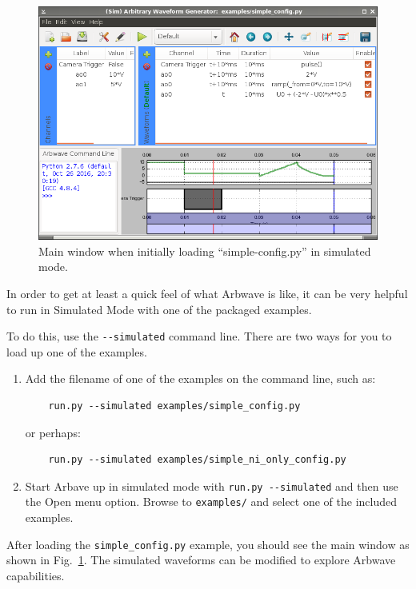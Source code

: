 \thispagestyle{fancy}
\pagestyle{fancy}

\begin{figure}[htb!]
  \centerline{\includegraphics[width=.8\textwidth]{figures/main-simple-config}}
  \caption{Main window when initially loading ``simple-config.py'' in simulated
  mode.}
  \label{fig:quick:main-simple-config}
\end{figure}


In order to get at least a quick feel of what Arbwave is like, it can be very
helpful to run in Simulated Mode with one of the packaged examples.

To do this, use the \verb|--simulated| command line.  There are two ways for you
to load up one of the examples.
\begin{enumerate}
  \item Add the filename of one of the examples on the command line, such as:\\
    \begin{verbatim}
    run.py --simulated examples/simple_config.py
    \end{verbatim}
    or perhaps:
    \begin{verbatim}
    run.py --simulated examples/simple_ni_only_config.py
    \end{verbatim}
  \item Start Arbave up in simulated mode with \verb|run.py --simulated| and
  then use the Open menu option.  Browse to \verb|examples/| and select one of
  the included examples.
\end{enumerate}
%
After loading the \verb|simple_config.py| example, you should see the main
window as shown in Fig.~\ref{fig:quick:main-simple-config}.  The simulated
waveforms can be modified to explore Arbwave capabilities.

